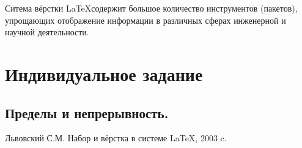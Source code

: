\documentclass[12pt]{article}
\begin{document}
Ситема вёрстки \LaTeX содержит большое количество инструментов (пакетов), упрощающих отображение информации в различных 
сферах инженерной и научной деятельности. 

\newpage
\section{Индивидуальное задание}
%

\subsection{Пределы и непрерывность.}


%

\newpage
{}
\begin{thebibliography}{99}
 Львовский С.М. Набор и вёрстка в системе \LaTeX, 2003 c.

\end{thebibliography}
\end{document}
